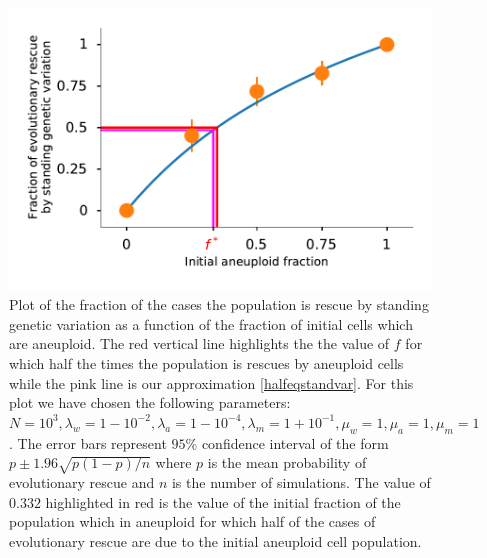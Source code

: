 \documentclass[12pt]{extarticle}
\begin{document}
\begin{figure}[!h]
 \vspace*{1\baselineskip}
\includegraphics[width=1\textwidth]{Figures/FractionPlot.pdf}
\caption{Plot of the fraction of the cases the population is rescue by standing genetic variation as a function of the fraction of initial cells which are aneuploid. The red vertical line highlights the the value of $f$ for which half the times the population is rescues by aneuploid cells while the pink line is our approximation \eqref{halfeqstandvar}. For this plot we have chosen the following parameters: $N=10^3, \lambda_w=1-10^{-2}, \lambda_a=1-10^{-4},\lambda_m=1+10^{-1},\mu_w=1,\mu_a=1,\mu_m=1$. The error bars represent $95\%$ confidence interval of the form $p\pm1.96\sqrt{p\left(1-p\right)/n}$ where $p$ is the mean probability of evolutionary rescue and $n$ is the number of simulations. The value of $0.332$ highlighted in red is the value of the initial fraction of the population which in aneuploid for which half of the cases of evolutionary rescue are due to the initial aneuploid cell population.}
\label{FractionPlot}
\end{figure}

\nolinenumbers
%


\pagebreak
\end{document}
